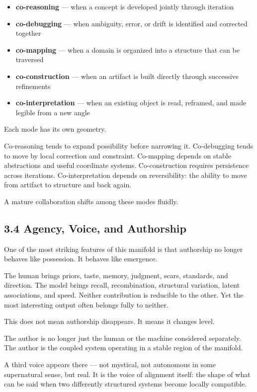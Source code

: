 \documentclass[
]{article}
\providecommand{\tightlist}{%
  \setlength{\itemsep}{0pt}\setlength{\parskip}{0pt}}
\begin{document}
\begin{itemize}
\tightlist
\item
  \textbf{co-reasoning} --- when a concept is developed jointly through
  iteration
\item
  \textbf{co-debugging} --- when ambiguity, error, or drift is
  identified and corrected together
\item
  \textbf{co-mapping} --- when a domain is organized into a structure
  that can be traversed
\item
  \textbf{co-construction} --- when an artifact is built directly
  through successive refinements
\item
  \textbf{co-interpretation} --- when an existing object is read,
  reframed, and made legible from a new angle
\end{itemize}

Each mode has its own geometry.

Co-reasoning tends to expand possibility before narrowing it.
Co-debugging tends to move by local correction and constraint.
Co-mapping depends on stable abstractions and useful coordinate systems.
Co-construction requires persistence across iterations.
Co-interpretation depends on reversibility: the ability to move from
artifact to structure and back again.

A mature collaboration shifts among these modes fluidly.

\hypertarget{agency-voice-and-authorship}{%
\subsection{3.4 Agency, Voice, and
Authorship}\label{agency-voice-and-authorship}}

One of the most striking features of this manifold is that authorship no
longer behaves like possession. It behaves like emergence.

The human brings priors, taste, memory, judgment, scars, standards, and
direction. The model brings recall, recombination, structural variation,
latent associations, and speed. Neither contribution is reducible to the
other. Yet the most interesting output often belongs fully to neither.

This does not mean authorship disappears. It means it changes level.

The author is no longer just the human or the machine considered
separately. The author is the coupled system operating in a stable
region of the manifold.

A third voice appears there --- not mystical, not autonomous in some
supernatural sense, but real. It is the voice of alignment itself: the
shape of what can be said when two differently structured systems become
locally compatible.
\end{document}
